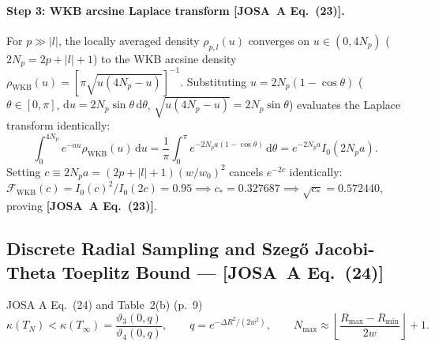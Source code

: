 \documentclass[10pt,letterpaper]{article}
\newcommand{\abs}[1]{\lvert #1 \rvert}
\newcommand{\dd}{\mathrm{d}}
\newcommand{\josa}[1]{\textbf{[JOSA~A Eq.~(#1)]}}
\numberwithin{equation}{section}
\begin{document}
\paragraph*{Step 3: WKB arcsine Laplace transform \josa{23}.}
For $p \gg \abs{l}$, the locally averaged density $\rho_{p,l}(u)$ converges on $u \in (0, 4N_p)$ ($2N_p = 2p + \abs{l} + 1$) to the WKB arcsine density $\rho_{\mathrm{WKB}}(u) = [\pi\sqrt{u(4N_p-u)}]^{-1}$. Substituting $u = 2N_p(1 - \cos\theta)$ ($\theta \in [0,\pi]$, $\dd u = 2N_p\sin\theta\,\dd\theta$, $\sqrt{u(4N_p-u)} = 2N_p\sin\theta$) evaluates the Laplace transform identically:
\begin{equation}
  \int_0^{4N_p} e^{-au}\rho_{\mathrm{WKB}}(u)\,\dd u = \frac{1}{\pi}\int_0^\pi e^{-2N_p a(1-\cos\theta)}\,\dd\theta = e^{-2N_p a} I_0(2N_p a).
\end{equation}
Setting $c \equiv 2N_p a = (2p+\abs{l}+1)(w/w_0)^2$ cancels $e^{-2c}$ identically: $\mathcal{F}_{\mathrm{WKB}}(c) = I_0(c)^2/I_0(2c) = 0.95 \implies c_* = 0.327687 \implies \sqrt{c_*} = \mathbf{0.572440}$, proving \josa{23}.

\subsection{Discrete Radial Sampling and Szeg\H{o} Jacobi-Theta Toeplitz Bound --- \josa{24}}
\label{sec:s6_gram}

\begin{targeteq}{JOSA A Eq.~(24) and Table~2(b) (p.~9)}
\[
  \kappa(T_N) < \kappa(T_\infty) = \frac{\vartheta_3(0,q)}{\vartheta_4(0,q)}, \qquad q = e^{-\Delta R^2/(2w^2)}, \qquad N_{\max} \approx \left\lfloor \frac{R_{\max}-R_{\min}}{2w} \right\rfloor + 1.
\]
\end{targeteq}
\end{document}
